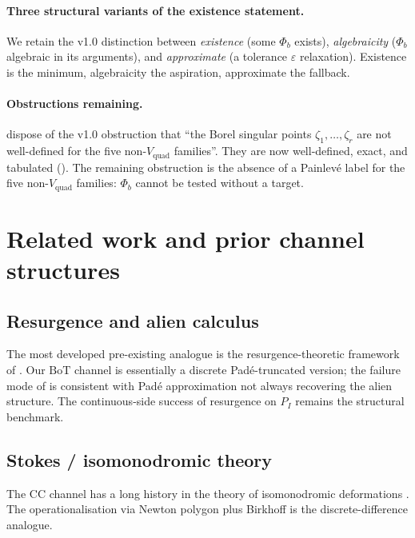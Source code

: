 \documentclass[11pt,reqno]{amsart}
\theoremstyle{plain}
\theoremstyle{definition}
\theoremstyle{remark}
\newcommand{\BoT}{\mathrm{BoT}}
\newcommand{\CC}{\mathrm{CC}}
\newcommand{\Vquad}{V_{\mathrm{quad}}}
\begin{document}
\paragraph{Three structural variants of the existence statement.}
We retain the v1.0 distinction between
\emph{existence} (some $\Phi_b$ exists),
\emph{algebraicity} ($\Phi_b$ algebraic in its arguments),
and \emph{approximate} (a tolerance $\varepsilon$ relaxation).
Existence is the minimum, algebraicity the aspiration,
approximate the fallback.

\paragraph{Obstructions remaining.}
 dispose of the v1.0
obstruction that ``the Borel singular points $\zeta_1, \ldots,
\zeta_r$ are not well-defined for the five non-$\Vquad$
families''. They are now well-defined, exact, and tabulated
(). The remaining obstruction is the
absence of a Painlev\'e label for the five non-$\Vquad$
families: $\Phi_b$ cannot be tested without a target.

\section{Related work and prior channel structures}
\label{sec:related}

\subsection{Resurgence and alien calculus}
The most developed pre-existing analogue is the
resurgence-theoretic framework of
\cite{ecalle1981fonctions, costin2008asymptotics,
sauzin2014resurgent, mitschi2016divergent}. Our $\BoT$
channel is essentially a discrete Pad\'e-truncated version;
the failure mode of \cite{siarc_borel_5x} is consistent with
Pad\'e approximation not always recovering the alien
structure. The continuous-side success of resurgence
\cite{delabaere2016divergent} on $P_I$ remains the structural
benchmark.

\subsection{Stokes / isomonodromic theory}
The $\CC$ channel has a long history in the theory of
isomonodromic deformations \cite{jimbomiwa1981monodromy,
vanderputsinger2003galois, boalch2001stokes}. The
operationalisation via Newton polygon plus Birkhoff
\cite{siarc_cc_pipeline_g} is the discrete-difference
analogue.
\end{document}
